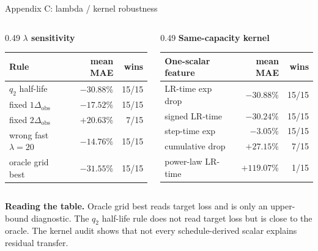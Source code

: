 \documentclass[9pt,aspectratio=169]{beamer}
\begin{document}
\begin{frame}{Appendix C: lambda / kernel robustness}
\scriptsize
\begin{columns}[T]
\begin{column}{0.49\textwidth}
\textbf{\(\lambda\) sensitivity}
\begin{tabular}{lrr}
\toprule
Rule & mean MAE & wins\\
\midrule
\(q_2\) half-life & \(-30.88\%\) & 15/15\\
fixed \(1\Delta_{\mathrm{obs}}\) & \(-17.52\%\) & 15/15\\
fixed \(2\Delta_{\mathrm{obs}}\) & \(+20.63\%\) & 7/15\\
wrong fast \(\lambda=20\) & \(-14.76\%\) & 15/15\\
oracle grid best & \(-31.55\%\) & 15/15\\
\bottomrule
\end{tabular}
\end{column}
\begin{column}{0.49\textwidth}
\textbf{Same-capacity kernel}
\begin{tabular}{lrr}
\toprule
One-scalar feature & mean MAE & wins\\
\midrule
LR-time exp drop & \(-30.88\%\) & 15/15\\
signed LR-time & \(-30.24\%\) & 15/15\\
step-time exp & \(-3.05\%\) & 15/15\\
cumulative drop & \(+27.15\%\) & 7/15\\
power-law LR-time & \(+119.07\%\) & 1/15\\
\bottomrule
\end{tabular}
\end{column}
\end{columns}
\vfill
\small
\textbf{Reading the table.}
Oracle grid best reads target loss and is only an upper-bound diagnostic.
The \(q_2\) half-life rule does not read target loss but is close to the oracle.
The kernel audit shows that not every schedule-derived scalar explains residual transfer.
\end{frame}
\end{document}
